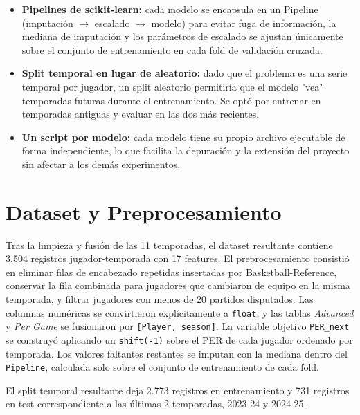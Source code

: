 \documentclass[11pt,a4paper]{article}
\begin{document}
\begin{itemize}[leftmargin=*, itemsep=4pt]
    \item \textbf{Pipelines de scikit-learn:} cada modelo se encapsula en un
    Pipeline (imputación $\to$ escalado $\to$ modelo) para evitar
    fuga de información, la mediana de imputación y los parámetros de
    escalado se ajustan únicamente sobre el conjunto de entrenamiento en
    cada fold de validación cruzada.

    \item \textbf{Split temporal en lugar de aleatorio:} dado que el
    problema es una serie temporal por jugador, un split aleatorio
    permitiría que el modelo "vea" temporadas futuras durante el
    entrenamiento. Se optó por entrenar en temporadas antiguas y evaluar en
    las dos más recientes.

    \item \textbf{Un script por modelo:} cada modelo tiene su propio archivo
    ejecutable de forma independiente, lo que facilita la depuración y la
    extensión del proyecto sin afectar a los demás experimentos.
\end{itemize}

\section{Dataset y Preprocesamiento}
\label{sec:datos}

Tras la limpieza y fusión de las 11 temporadas, el dataset resultante
contiene 3.504 registros jugador-temporada con 17 features. El
preprocesamiento consistió en eliminar filas de encabezado repetidas
insertadas por Basketball-Reference, conservar la fila combinada para
jugadores que cambiaron de equipo en la misma temporada, y filtrar jugadores
con menos de 20 partidos disputados. Las columnas numéricas se convirtieron
explícitamente a \texttt{float}, y las tablas \textit{Advanced} y
\textit{Per Game} se fusionaron por \texttt{[Player, season]}. La variable
objetivo \texttt{PER\_next} se construyó aplicando un \texttt{shift(-1)}
sobre el PER de cada jugador ordenado por temporada. Los valores faltantes
restantes se imputan con la mediana dentro del \texttt{Pipeline}, calculada
solo sobre el conjunto de entrenamiento de cada fold.

El split temporal resultante deja 2.773 registros en entrenamiento
y 731 registros en test correspondiente a las últimas 2 temporadas, 2023-24 y 2024-25.
\end{document}
